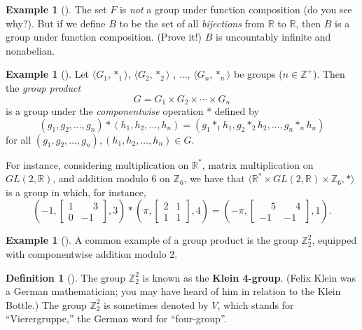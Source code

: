 \documentclass[10pt,]{book}
\newcommand{\terminology}[1]{\textbf{#1}}
\theoremstyle{plain}
\theoremstyle{definition}
\newtheorem{definition}[theorem]{Definition}
\theoremstyle{definition}
\theoremstyle{definition}
\newtheorem{example}[theorem]{Example}
\theoremstyle{definition}
\numberwithin{equation}{section}
\def\Z{\mathbb{Z}}
\def\R{\mathbb{R}}
\newcommand{\amp}{&}
\begin{document}
\begin{example}[]\label{example-20}
The set \(F\) is \emph{not} a group under function composition (do you see why?). But if we define \(B\) to be the set of all \emph{bijections} from \(\R\) to \(\R\), then \(B\) is a group under function composition. (Prove it!) \(B\) is uncountably infinite and nonabelian.%
\end{example}
\begin{example}[]\label{gpprod}
Let \(\langle G_1,*_1\rangle\), \(\langle G_2,*_2\rangle\) , \(\ldots\), \(\langle G_n,*_n\rangle\) be groups (\(n\in \Z^+\)). Then the \emph{group product}%
\begin{equation*}
G=G_1\times G_2\times \cdots \times G_n
\end{equation*}
is a group under the \emph{componentwise} operation \(*\) defined by%
\begin{equation*}
(g_1,g_2,\ldots, g_n)*(h_1,h_2,\ldots,h_n)=(g_1*_1h_1, g_2*_2h_2,\ldots, g_n*_nh_n)
\end{equation*}
for all \((g_1,g_2,\ldots, g_n),(h_1,h_2,\ldots,h_n)\in G\).%
\par
For instance, considering multiplication on \(\R^*\), matrix multiplication on \(GL(2,\R)\), and addition modulo \(6\) on \(\Z_6\), we have that \(\langle \R^*\times GL(2,\R) \times \Z_6,*\rangle\) is a group in which, for instance,%
\begin{equation*}
\left(-1, \begin{bmatrix}
1 \amp  \phantom{-}3 \\
0 \amp  -1
\end{bmatrix},
3\right)
*\left(\pi,
\begin{bmatrix}
2 \amp  1 \\
1 \amp  1
\end{bmatrix},
4\right)=\left(-\pi, 
\begin{bmatrix}
\phantom{-}5 \amp  \phantom{-}4 \\
-1 \amp -1
\end{bmatrix} 
,1\right).
\end{equation*}
%
\end{example}
\begin{example}[]\label{example-22}
A common example of a group product is the group \(\Z_2^2\), equipped with componentwise addition modulo 2.%
\end{example}
\begin{definition}[{}]\label{definition-30}
The group \(\Z_2^2\) is known as the \terminology{Klein 4-group}. (Felix Klein was a German mathematician; you may have heard of him in relation to the Klein Bottle.) The group \(\Z_2^2\) is sometimes denoted by \(V\), which stands for ``Vierergruppe,'' the German word for ``four-group''.%
\end{definition}
\typeout{************************************************}
\typeout{************************************************}
\end{document}
